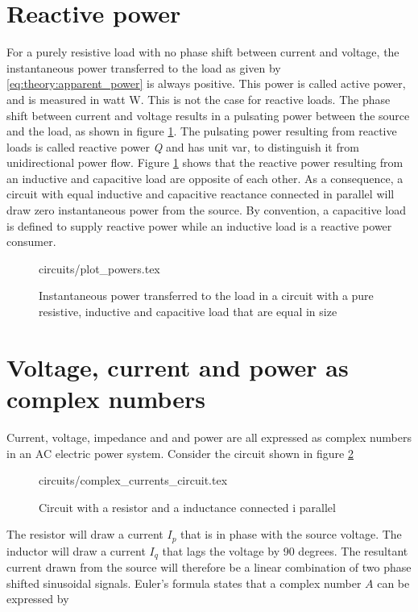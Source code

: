 \documentclass[class=book, crop=false]{standalone}
\begin{document}
\section{Reactive power}
For a purely resistive load with no phase shift between current and voltage, the instantaneous power transferred to the load as given by \eqref{eq:theory:apparent_power} is always positive. This power is called active power, and is measured in watt W. This is not the case for reactive loads. The phase shift between current and voltage results in a pulsating power between the source and the load, as shown in figure \ref{fig:theory:reactive_powers}. The pulsating power resulting from reactive loads is called reactive power \textit{Q} and has unit var, to distinguish it from unidirectional power flow. Figure \ref{fig:theory:reactive_powers} shows that the reactive power resulting from an inductive and capacitive load are opposite of each other. As a consequence, a circuit with equal inductive and capacitive reactance connected in parallel will draw zero instantaneous power from the source. By convention, a capacitive load is defined to supply reactive power while an inductive load is a reactive power consumer. 

\begin{figure}[ht!]
    \center
    {circuits/plot_powers.tex}
    \caption[size = 9]
    {Instantaneous power transferred to the load in a circuit with a pure resistive, inductive and capacitive load that are equal in size}\label{fig:theory:reactive_powers}
\end{figure}


\section{Voltage, current and power as complex numbers}

Current, voltage, impedance and and power are all expressed as complex numbers in an AC electric power system. Consider the circuit shown in figure \ref{fig:theory:complex_current_circuit}
\begin{figure}[ht!]
    \center
    {circuits/complex_currents_circuit.tex}
    \caption[size = 9]
    {Circuit with a resistor and a inductance connected i parallel}\label{fig:theory:complex_current_circuit}
\end{figure}
The resistor will draw a current $I_{p}$ that is in phase with the source voltage. The inductor will draw a current $I_{q}$ that lags the voltage by 90 degrees. The resultant current drawn from the source will therefore be a linear combination of two phase shifted sinusoidal signals. Euler's formula states that a complex number $A$ can be expressed by
\end{document}
